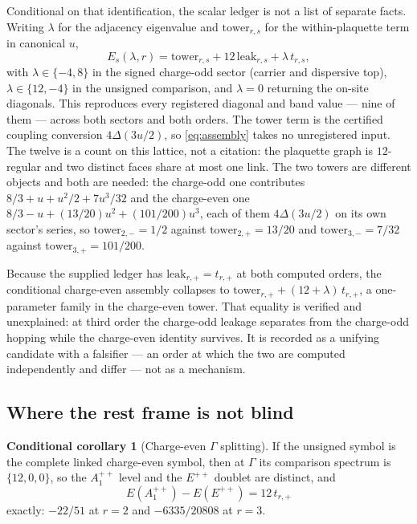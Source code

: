 \documentclass[11pt]{article}
\theoremstyle{plain}
\theoremstyle{definition}
\newtheorem{conditional}[theorem]{Conditional corollary}
\theoremstyle{remark}
\newcommand{\chk}[1]{}
\begin{document}
Conditional on that identification, the scalar ledger is not a list of
separate facts. Writing $\lambda$ for the
adjacency eigenvalue and $\mathrm{tower}_{r,s}$ for the within-plaquette term
in canonical $u$,
\begin{equation}\label{eq:assembly}
  E_s(\lambda,r)=\mathrm{tower}_{r,s}+12\,\mathrm{leak}_{r,s}+\lambda\,t_{r,s},
\end{equation}
with $\lambda\in\{-4,8\}$ in the signed charge-odd sector (carrier and dispersive
top), $\lambda\in\{12,-4\}$ in the unsigned comparison, and $\lambda=0$
returning the on-site diagonals. This reproduces every registered diagonal
and band value --- nine of them --- across both sectors and both orders. The
tower term is the certified coupling conversion $4\Delta(3u/2)$, so
\eqref{eq:assembly} takes no unregistered input. The twelve is a count on this
lattice, not a citation: the plaquette graph is $12$-regular and two distinct
faces share at most one link. The two towers are different objects and both
are needed: the charge-odd one contributes
$8/3+u+u^2/2+7u^3/32$ and the charge-even one $8/3-u+(13/20)u^2+(101/200)u^3$,
each of them $4\Delta(3u/2)$ on its own sector's series, so
$\mathrm{tower}_{2,-}=1/2$ against $\mathrm{tower}_{2,+}=13/20$ and
$\mathrm{tower}_{3,-}=7/32$ against $\mathrm{tower}_{3,+}=101/200$.
\chk{one assembly formula gives every registered band value}
\chk{one assembly formula gives every C-even value at both orders}
\chk{the plaquette graph is 12-regular and two faces share at most one link}

Because the supplied ledger has $\mathrm{leak}_{r,+}=t_{r,+}$ at both computed
orders, the conditional charge-even assembly collapses to
$\mathrm{tower}_{r,+}+(12+\lambda)\,t_{r,+}$, a one-parameter family in the
charge-even tower. That
equality is verified and unexplained: at third order the charge-odd leakage
separates from the charge-odd hopping while the charge-even identity survives.
It is recorded as a unifying candidate with a falsifier --- an order at which
the two are computed independently and differ --- not as a mechanism.
\chk{both declared coincidences, checked: one is ell\_N at all ranks, the other is bare}

\subsection{Where the rest frame is not blind}

\begin{conditional}[Charge-even $\Gamma$ splitting]\label{prop:evengamma}
If the unsigned symbol is the complete linked charge-even symbol, then at
$\Gamma$ its comparison spectrum is $\{12,0,0\}$, so the $A_1^{++}$ level
and the $E^{++}$ doublet are distinct, and
\[
  E(A_1^{++})-E(E^{++})=12\,t_{r,+}
\]
exactly: $-22/51$ at $r=2$ and $-6335/20808$ at $r=3$.
\end{conditional}
\chk{the C-even Gamma point pins t\_+, exactly where no C-odd Gamma datum can}
\end{document}
